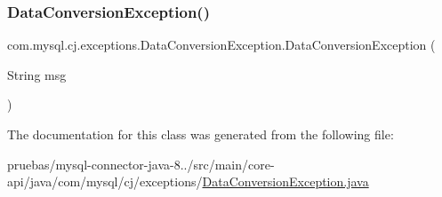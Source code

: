 \subsubsection{\texorpdfstring{Data\+Conversion\+Exception()}{DataConversionException()}}
{\footnotesize\ttfamily com.\+mysql.\+cj.\+exceptions.\+Data\+Conversion\+Exception.\+Data\+Conversion\+Exception (\begin{DoxyParamCaption}\item[{String}]{msg }\end{DoxyParamCaption})}



The documentation for this class was generated from the following file\+:\begin{DoxyCompactItemize}
\item 
pruebas/mysql-\/connector-\/java-\/8../src/main/core-\/api/java/com/mysql/cj/exceptions/\mbox{\hyperlink{_data_conversion_exception_8java}{Data\+Conversion\+Exception.\+java}}\end{DoxyCompactItemize}
